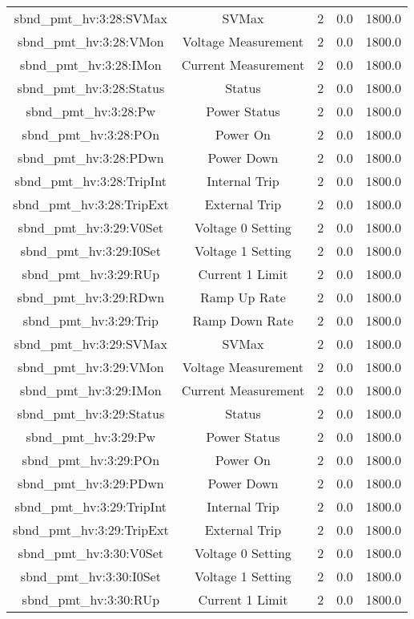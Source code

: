 \begin{table}[ptb]
\begin{tabular}{c | c c c c}
sbnd_pmt_hv:3:28:SVMax & SVMax & 2 & 0.0 & 1800.0\\ 
sbnd_pmt_hv:3:28:VMon & Voltage Measurement & 2 & 0.0 & 1800.0\\ 
sbnd_pmt_hv:3:28:IMon & Current Measurement & 2 & 0.0 & 1800.0\\ 
sbnd_pmt_hv:3:28:Status & Status & 2 & 0.0 & 1800.0\\ 
sbnd_pmt_hv:3:28:Pw & Power Status & 2 & 0.0 & 1800.0\\ 
sbnd_pmt_hv:3:28:POn & Power On & 2 & 0.0 & 1800.0\\ 
sbnd_pmt_hv:3:28:PDwn & Power Down & 2 & 0.0 & 1800.0\\ 
sbnd_pmt_hv:3:28:TripInt & Internal Trip & 2 & 0.0 & 1800.0\\ 
sbnd_pmt_hv:3:28:TripExt & External Trip & 2 & 0.0 & 1800.0\\ 
sbnd_pmt_hv:3:29:V0Set & Voltage 0 Setting & 2 & 0.0 & 1800.0\\ 
sbnd_pmt_hv:3:29:I0Set & Voltage 1 Setting & 2 & 0.0 & 1800.0\\ 
sbnd_pmt_hv:3:29:RUp & Current 1 Limit & 2 & 0.0 & 1800.0\\ 
sbnd_pmt_hv:3:29:RDwn & Ramp Up Rate & 2 & 0.0 & 1800.0\\ 
sbnd_pmt_hv:3:29:Trip & Ramp Down Rate & 2 & 0.0 & 1800.0\\ 
sbnd_pmt_hv:3:29:SVMax & SVMax & 2 & 0.0 & 1800.0\\ 
sbnd_pmt_hv:3:29:VMon & Voltage Measurement & 2 & 0.0 & 1800.0\\ 
sbnd_pmt_hv:3:29:IMon & Current Measurement & 2 & 0.0 & 1800.0\\ 
sbnd_pmt_hv:3:29:Status & Status & 2 & 0.0 & 1800.0\\ 
sbnd_pmt_hv:3:29:Pw & Power Status & 2 & 0.0 & 1800.0\\ 
sbnd_pmt_hv:3:29:POn & Power On & 2 & 0.0 & 1800.0\\ 
sbnd_pmt_hv:3:29:PDwn & Power Down & 2 & 0.0 & 1800.0\\ 
sbnd_pmt_hv:3:29:TripInt & Internal Trip & 2 & 0.0 & 1800.0\\ 
sbnd_pmt_hv:3:29:TripExt & External Trip & 2 & 0.0 & 1800.0\\ 
sbnd_pmt_hv:3:30:V0Set & Voltage 0 Setting & 2 & 0.0 & 1800.0\\ 
sbnd_pmt_hv:3:30:I0Set & Voltage 1 Setting & 2 & 0.0 & 1800.0\\ 
sbnd_pmt_hv:3:30:RUp & Current 1 Limit & 2 & 0.0 & 1800.0\\ 

\end{tabular}
\end{table}
